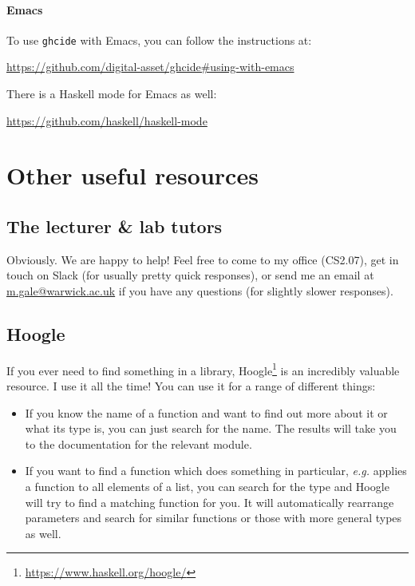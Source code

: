 \paragraph{Emacs} To use \texttt{\small ghcide} with Emacs, you can follow the instructions at:
\begin{center}\small
	\parbox{13cm}{\centering\url{https://github.com/digital-asset/ghcide\#using-with-emacs}}
\end{center}
There is a Haskell mode for Emacs as well:
\begin{center} \small
\url{https://github.com/haskell/haskell-mode}
\end{center}

\section{Other useful resources}
\label{sec:useful-resources}

\subsection{The lecturer \& lab tutors} 
\label{sec:getting-help}

Obviously. We are happy to help! Feel free to come to my office (CS2.07), get in touch on Slack (for usually pretty quick responses), or send me an email at \href{mailto:m.gale@warwick.ac.uk}{m.gale@warwick.ac.uk} if you have any questions (for slightly slower responses). 

\subsection{Hoogle} 

If you ever need to find something in a library, Hoogle\footnote{\url{https://www.haskell.org/hoogle/}} is an incredibly valuable resource. I use it all the time! You can use it for a range of different things:
\begin{itemize}
\item If you know the name of a function and want to find out more about it or what its type is, you can just search for the name. The results will take you to the documentation for the relevant module.
\item If you want to find a function which does something in particular, \emph{e.g.} applies a function to all elements of a list, you can search for the type and Hoogle will try to find a matching function for you. It will automatically rearrange parameters and search for similar functions or those with more general types as well. 
\end{itemize}

